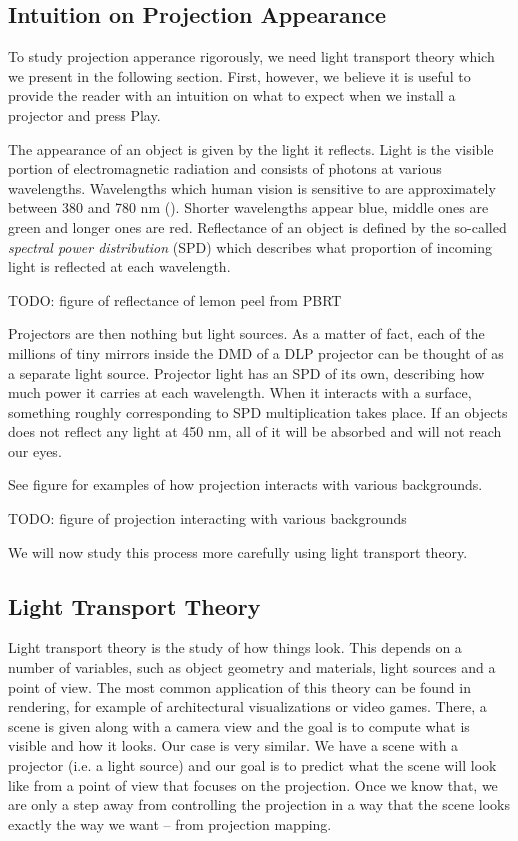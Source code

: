 \subsection{Intuition on Projection Appearance}
\label{section:background-projection_mapping-projection_intuition}

To study projection apperance rigorously, we need light transport theory which we present in the following section. First, however, we believe it is useful to provide the reader with an intuition on what to expect when we install a projector and press Play.

The appearance of an object is given by the light it reflects. Light is the visible portion of electromagnetic radiation and consists of photons at various wavelengths. Wavelengths which human vision is sensitive to are approximately between 380 and 780 nm (\citet{PBRT3e}). Shorter wavelengths appear blue, middle ones are green and longer ones are red. Reflectance of an object is defined by the so-called \textit{spectral power distribution} (SPD) which describes what proportion of incoming light is reflected at each wavelength.

{\color{red} TODO: figure of reflectance of lemon peel from PBRT}

Projectors are then nothing but light sources. As a matter of fact, each of the millions of tiny mirrors inside the DMD of a DLP projector can be thought of as a separate light source. Projector light has an SPD of its own, describing how much power it carries at each wavelength. When it interacts with a surface, something roughly corresponding to SPD multiplication takes place. If an objects does not reflect any light at 450 nm, all of it will be absorbed and will not reach our eyes.

See figure for examples of how projection interacts with various backgrounds.

{\color{red} TODO: figure of projection interacting with various backgrounds}

We will now study this process more carefully using light transport theory.

\subsection{Light Transport Theory}
\label{section:background-projection_mapping-light_transport}

Light transport theory is the study of how things look. This depends on a number of variables, such as object geometry and materials, light sources and a point of view. The most common application of this theory can be found in rendering, for example of architectural visualizations or video games. There, a scene is given along with a camera view and the goal is to compute what is visible and how it looks. Our case is very similar. We have a scene with a projector (i.e. a light source) and our goal is to predict what the scene will look like from a point of view that focuses on the projection. Once we know that, we are only a step away from controlling the projection in a way that the scene looks exactly the way we want -- from projection mapping.

